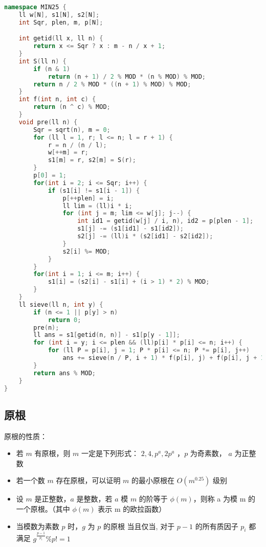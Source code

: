 \begin{lstlisting}[language=C++]
namespace MIN25 {
    ll w[N], s1[N], s2[N];
    int Sqr, plen, m, p[N];

    int getid(ll x, ll n) {
        return x <= Sqr ? x : m - n / x + 1;
    }
    int S(ll n) {
        if (n & 1)
            return (n + 1) / 2 % MOD * (n % MOD) % MOD;
        return n / 2 % MOD * ((n + 1) % MOD) % MOD;
    }
    int f(int n, int c) {
        return (n ^ c) % MOD;
    }
    void pre(ll n) {
        Sqr = sqrt(n), m = 0;
        for (ll l = 1, r; l <= n; l = r + 1) {
            r = n / (n / l);
            w[++m] = r;
            s1[m] = r, s2[m] = S(r);
        }
        p[0] = 1;
        for(int i = 2; i <= Sqr; i++) {
            if (s1[i] != s1[i - 1]) {
                p[++plen] = i;
                ll lim = (ll)i * i;
                for (int j = m; lim <= w[j]; j--) {
                    int id1 = getid(w[j] / i, n), id2 = p[plen - 1];
                    s1[j] -= (s1[id1] - s1[id2]);
                    s2[j] -= (ll)i * (s2[id1] - s2[id2]);
                }
                s2[i] %= MOD;
            }
        }
        for(int i = 1; i <= m; i++) {
            s1[i] = (s2[i] - s1[i] + (i > 1) * 2) % MOD;
        }
    }
    ll sieve(ll n, int y) {
        if (n <= 1 || p[y] > n)
            return 0;
        pre(n);
        ll ans = s1[getid(n, n)] - s1[p[y - 1]];
        for (int i = y; i <= plen && (ll)p[i] * p[i] <= n; i++) {
            for (ll P = p[i], j = 1; P * p[i] <= n; P *= p[i], j++)
                ans += sieve(n / P, i + 1) * f(p[i], j) + f(p[i], j + 1);
        }
        return ans % MOD;
    }
}
\end{lstlisting}


\subsection{原根}

原根的性质：

\begin{itemize}
    \item 若 $m$ 有原根，则 $m$ 一定是下列形式： $2, 4, p^a, 2p^a$ ，$p$ 为奇素数， $a$ 为正整数
    \item 若一个数 $m$ 存在原根，可以证明 $m$ 的最小原根在 $O(m^{0.25})$ 级别
    \item 设 $m$ 是正整数，$a$ 是整数，若 $a$ 模 $m$ 的阶等于 $\phi (m)$，则称 a 为模 m 的一个原根。（其中 $\phi (m)$ 表示 m 的欧拉函数）
    \item 当模数为素数 $p$ 时，$g$ 为 $p$ 的原根 当且仅当, 对于 $p - 1$ 的所有质因子 $p _ i$ 都满足 $g ^ {\frac{p - 1}{p _ i}} \% p != 1$
\end{itemize}

